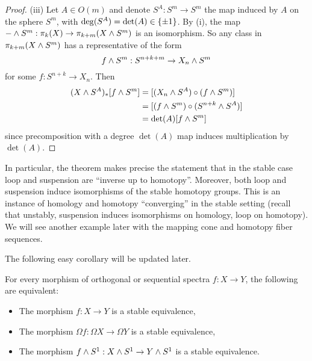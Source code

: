 \begin{proof}
(iii) Let $A\in O(m)$ and denote $S^A:S^m\to S^m$ the map induced by $A$ on the sphere $S^m$, with $\deg(S^A)=\operatorname{det}(A)\in\{\pm1\}$. By (i), the map $-\wedge S^m:\pi_k(X)\to\pi_{k+m}(X\wedge S^m)$ is an isomorphism. So any class in $\pi_{k+m}(X\wedge S^m)$ has a representative of the form
\[f\wedge S^m:S^{n+k+m}\to X_n\wedge S^m\]
for some $f:S^{n+k}\to X_n$. Then
\begin{align*}
    (X\wedge S^A)_*[f\wedge S^m]&=[(X_n\wedge S^A)\circ(f\wedge S^m)]\\
    &=[(f\wedge S^m)\circ(S^{n+k}\wedge S^A)]\\
    &=\operatorname{det}(A)[f\wedge S^m]
\end{align*}
since precomposition with a degree $\det(A)$ map induces multiplication by $\det(A)$.
\end{proof}

In particular, the theorem makes precise the statement that in the stable case loop and suspension are \enquote{inverse up to homotopy}. Moreover, both loop and suspension induce isomorphisms of the stable homotopy groups. This is an instance of homology and homotopy \enquote{converging} in the stable setting (recall that unstably, suspension induces isomorphisms on homology, loop on homotopy). We will see another example later with the mapping cone and homotopy fiber sequences.

The following easy corollary will be updated later.

\begin{corollary}\label{corollary:loop-and-suspension-of-stable-equivalence}
For every morphism of orthogonal or sequential spectra $f:X\to Y$, the following are equivalent:
\begin{itemize}
    \item[i)] The morphism $f:X\to Y$ is a stable equivalence,
    \item[ii)] The morphism $\Omega f:\Omega X\to\Omega Y$ is a stable equivalence,
    \item[iii)] The morphism $f\wedge S^1:X\wedge S^1\to Y\wedge S^1$ is a stable equivalence.
\end{itemize}
\end{corollary}

